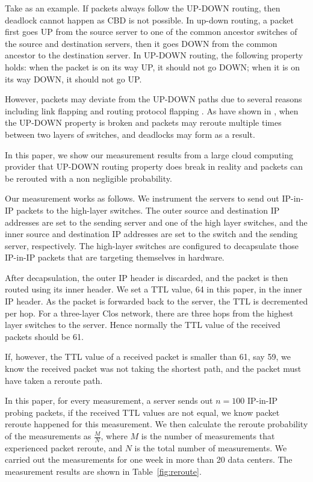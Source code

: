 Take  as an example. If packets always follow the UP-DOWN routing, then deadlock cannot
happen as CBD is not possible. In up-down routing, a packet first goes UP from the source server to one of the common ancestor switches of the source and destination servers, then it goes DOWN from the common ancestor to the destination server.
In UP-DOWN routing, the following property holds: when the packet is on its way UP, it should not go DOWN; when it is on its way DOWN, it should not go UP.

However, packets may deviate from the UP-DOWN paths due to several reasons including link flapping and routing protocol flapping \cite{f10}.
As have shown in \cite{shpiner2016unlocking}, when the UP-DOWN property is broken and packets may reroute multiple times between two layers of switches, and deadlocks may form as a result.

In this paper, we show our measurement results from a large cloud computing provider that UP-DOWN routing property does break in reality and packets can be rerouted with a non negligible probability.

Our measurement works as follows. We instrument the servers to send out IP-in-IP packets to the high-layer switches. The outer source and destination IP addresses are set to the sending server and one of the high layer switches, and the inner source and destination IP addresses are set to the switch and the sending server, respectively. The high-layer switches are configured to decapsulate those IP-in-IP packets that are targeting themselves in hardware.

After decapsulation, the outer IP header is discarded, and the packet is then routed using its inner header. We set a TTL value, 64 in this paper, in the inner IP header. As the packet is forwarded back to the server, the TTL is decremented per hop. For a three-layer Clos network, there are three hops from the highest layer switches to the server. Hence normally the TTL value of the received packets should be 61.

If, however, the TTL value of a received packet is smaller than 61, say 59, we know the received packet was not taking the shortest path, and the packet must have taken a reroute path.

In this paper, for every measurement, a server sends out $n=100$ IP-in-IP probing packets, if the received TTL values are not equal, we know packet reroute happened for this measurement. We then calculate the reroute probability of the measurements as $\frac{M}{N}$, where $M$ is the number of measurements that experienced packet reroute, and $N$ is the total number of measurements. We carried out the measurements for one week in more than 20 data centers. The measurement results are shown in Table~\ref{fig:reroute}.

